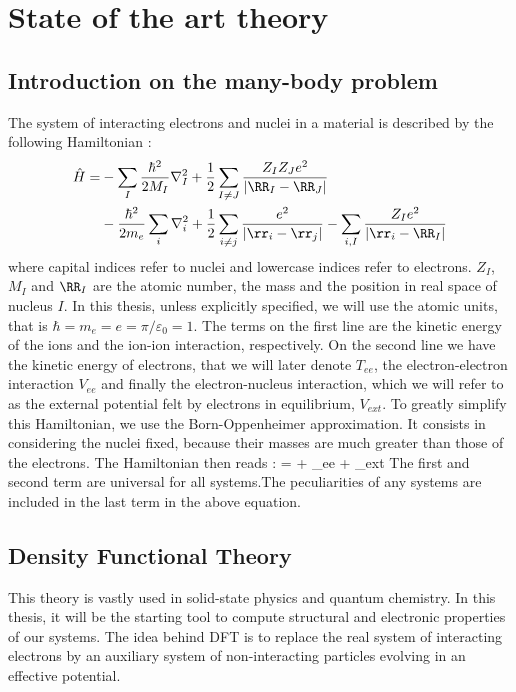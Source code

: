 \linenumbers
\chapter{ State of the art theory}
\chaptertoc{}

\section{Introduction on the many-body problem}
The system of interacting electrons and nuclei in a material is described by the following Hamiltonian :
\begin{align}
	\hat{H} = &- \sum_I \frac{\hbar^2}{2 M_I} \nabla^2_I + \frac{1}{2} \sum_{I\neq J} \frac{Z_I Z_J e^2}{\left| \RR_I - \RR_J \right|} \nonumber \\
	&- \frac{\hbar^2}{2m_e} \sum_i \nabla^2_i + \frac{1}{2} \sum_{i\neq j} \frac{e^2}{\left| \rr_i - \rr_j \right|} - \sum_{i,I} \frac{Z_I e^2}{\left|\rr_i - \RR_I \right|}
\end{align}
where capital indices refer to nuclei and lowercase indices refer to electrons. $Z_I$, $M_I$ and $\RR_I$ are the atomic number, the mass and the position in real space of nucleus $I$. In this thesis, unless explicitly specified, we will use the atomic units, that is $\hbar = m_e = e =\pi/\varepsilon_0 =1$.
The terms on the first line are the kinetic energy of the ions and the ion-ion interaction, respectively. On the second line we have the kinetic energy of electrons, that we will later denote $T_{ee}$, the electron-electron interaction $V_{ee}$ and finally the electron-nucleus interaction, which we will refer to as the external potential felt by electrons in equilibrium, $V_{ext}$. To greatly simplify this Hamiltonian, we use the Born-Oppenheimer approximation. It consists in considering the nuclei fixed, because their masses are much greater than those of the electrons. The Hamiltonian then reads :
\be
	 =  + _{ee} + _{ext}
\ee
The first and second term are universal for all systems.The peculiarities of any systems are included in the last term in the above equation.

\section{Density Functional Theory}
This theory is vastly used in solid-state physics and quantum chemistry. In this thesis, it will be the starting tool to compute structural and electronic properties of our systems. The idea behind \gls{DFT} is to replace the real system of interacting electrons by an auxiliary system of non-interacting particles evolving in an effective potential.

